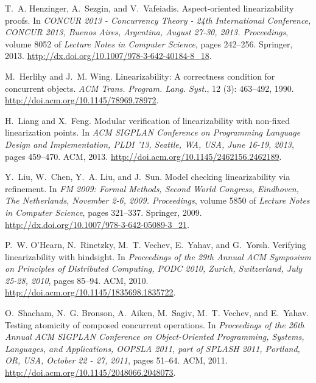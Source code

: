 \documentclass[9pt,natbib,authoryear]{sigplanconf}
\begin{document}
\begin{thebibliography}{26}
T.~A. Henzinger, A.~Sezgin, and V.~Vafeiadis.
\newblock Aspect-oriented linearizability proofs.
\newblock In \emph{{CONCUR} 2013 - Concurrency Theory - 24th International
  Conference, {CONCUR} 2013, Buenos Aires, Argentina, August 27-30, 2013.
  Proceedings}, volume 8052 of \emph{Lecture Notes in Computer Science}, pages
  242--256. Springer, 2013.
\newblock \url{http://dx.doi.org/10.1007/978-3-642-40184-8_18}.

M.~Herlihy and J.~M. Wing.
\newblock Linearizability: {A} correctness condition for concurrent objects.
\newblock \emph{{ACM} Trans. Program. Lang. Syst.}, 12 (3):
  463--492, 1990.
\newblock \url{http://doi.acm.org/10.1145/78969.78972}.

H.~Liang and X.~Feng.
\newblock Modular verification of linearizability with non-fixed linearization
  points.
\newblock In \emph{{ACM} {SIGPLAN} Conference on Programming Language Design
  and Implementation, {PLDI} '13, Seattle, WA, USA, June 16-19, 2013}, pages
  459--470. {ACM}, 2013.
\newblock \url{http://doi.acm.org/10.1145/2462156.2462189}.

Y.~Liu, W.~Chen, Y.~A. Liu, and J.~Sun.
\newblock Model checking linearizability via refinement.
\newblock In \emph{{FM} 2009: Formal Methods, Second World Congress, Eindhoven,
  The Netherlands, November 2-6, 2009. Proceedings}, volume 5850 of
  \emph{Lecture Notes in Computer Science}, pages 321--337. Springer, 2009.
\newblock \url{http://dx.doi.org/10.1007/978-3-642-05089-3_21}.

P.~W. O'Hearn, N.~Rinetzky, M.~T. Vechev, E.~Yahav, and G.~Yorsh.
\newblock Verifying linearizability with hindsight.
\newblock In \emph{Proceedings of the 29th Annual {ACM} Symposium on Principles
  of Distributed Computing, {PODC} 2010, Zurich, Switzerland, July 25-28,
  2010}, pages 85--94. {ACM}, 2010.
\newblock \url{http://doi.acm.org/10.1145/1835698.1835722}.

O.~Shacham, N.~G. Bronson, A.~Aiken, M.~Sagiv, M.~T. Vechev, and E.~Yahav.
\newblock Testing atomicity of composed concurrent operations.
\newblock In \emph{Proceedings of the 26th Annual {ACM} {SIGPLAN} Conference on
  Object-Oriented Programming, Systems, Languages, and Applications, {OOPSLA}
  2011, part of {SPLASH} 2011, Portland, OR, USA, October 22 - 27, 2011}, pages
  51--64. {ACM}, 2011.
\newblock \url{http://doi.acm.org/10.1145/2048066.2048073}.


\end{thebibliography}
\end{document}
